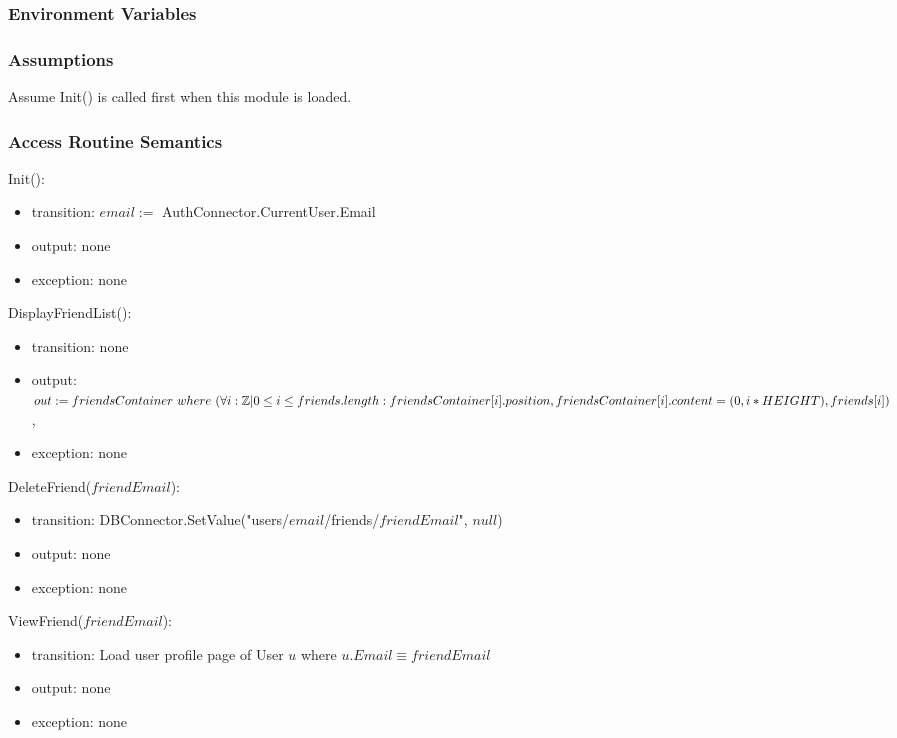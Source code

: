 \documentclass[12pt, titlepage]{article}
\begin{document}
\subsubsection{Environment Variables}

\subsubsection{Assumptions}

Assume Init() is called first when this module is loaded.

\subsubsection{Access Routine Semantics}

\noindent Init():
\begin{itemize}
\item transition: $email :=$ AuthConnector.CurrentUser.Email
\item output: none
\item exception: none
\end{itemize}

\noindent DisplayFriendList():
\begin{itemize}
\item transition: none
\item output: $out := friendsContainer\ where\ (\forall i : \mathbb{Z} | 0 \leq i \leq friends.length:\\ friendsContainer[i].position, friendsContainer[i].content =\\ (0, i*HEIGHT), friends[i])$,
\item exception: none
\end{itemize}

\noindent DeleteFriend($friendEmail$):
\begin{itemize}
\item transition: DBConnector.SetValue("users/$email$/friends/$friendEmail$", $null$)
\item output: none
\item exception: none
\end{itemize}

\noindent ViewFriend($friendEmail$):
\begin{itemize}
\item transition: Load user profile page of User $u$ where $u.Email \equiv friendEmail$ 
\item output: none
\item exception: none
\end{itemize}
\end{document}
